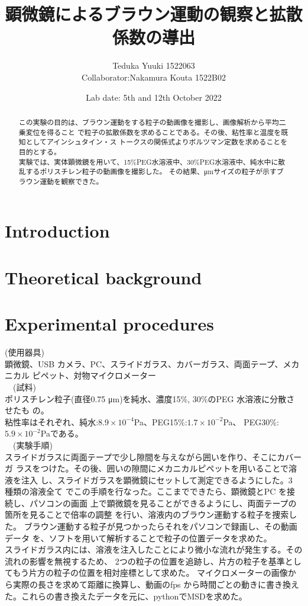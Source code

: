 \documentclass[a4paper,10pt]{jsarticle}
\begin{document}
\title{{顕微鏡によるブラウン運動の観察と拡散係数の導出}}
\author{Teduka Yuuki 1522063 
\\
Collaborator:Nakamura Kouta 1522B02 }
\date{Lab date: 5th and 12th October 2022}
\maketitle

\begin{abstract}
この実験の目的は、ブラウン運動をする粒子の動画像を撮影し、画像解析から平均二乗変位を得ること
で粒子の拡散係数を求めることである。その後、粘性率と温度を既知としてアインシュタイン・ス
トークスの関係式よりボルツマン定数を求めることを目的とする。\\
実験では、実体顕微鏡を用いて、15\%PEG水溶液中、30\%PEG水溶液中、純水中に散乱するポリスチレン粒子の動画像を撮影した。
その結果、μmサイズの粒子が示すブラウン運動を観察できた。

\end{abstract}

\section{\textrm{Introduction}}
\section{\textrm{Theoretical background}}
\section{\textrm{Experimental procedures}}
(使用器具)\\
顕微鏡、USB カメラ、PC、スライドガラス、カバーガラス、両面テープ、メカニカル
ピペット、対物マイクロメーター\\
　(試料)\\
ポリスチレン粒子(直径0.75 μm)を純水、濃度15\%, 30\%のPEG 水溶液に分散させたも
の。\\粘性率はそれぞれ、純水:$8.9\times 10^{-4}$Pa、PEG15\%:$1.7\times 10^{-2}$Pa、
PEG30\%:$5.9\times 10^{-2}$Paである。\\
　(実験手順)\\
スライドガラスに両面テープで少し隙間を与えながら囲いを作り、そこにカバーガ
ラスをつけた。その後、囲いの隙間にメカニカルピペットを用いることで溶液を注入
し、スライドガラスを顕微鏡にセットして測定できるようにした。3 種類の溶液全て
でこの手順を行なった。ここまでできたら、顕微鏡とPC を接続し、パソコンの画面
上で顕微鏡を見ることができるようにし、両面テープの箇所を見ることで倍率の調整
を行い、溶液内のブラウン運動する粒子を捜索した。
ブラウン運動する粒子が見つかったらそれをパソコンで録画し、その動画データ
を、ソフトを用いて解析することで粒子の位置データを求めた。\\
スライドガラス内には、溶液を注入したことにより微小な流れが発生する。その流れの影響を無視するため、
2つの粒子の位置を追跡し、片方の粒子を基準としてもう片方の粒子の位置を相対座標として求めた。
マイクロメーターの画像から実際の長さを求めて距離に換算し、動画のfps から時間ごとの動きに書き換えた。これらの書き換えたデータを元に、pythonでMSDを求めた。\\
\end{document}
